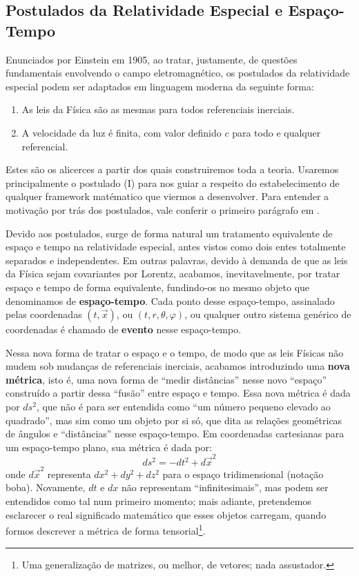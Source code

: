 \documentclass[12pt,a4paper]{article}
\begin{document}
\subsection{Postulados da Relatividade Especial e Espaço-Tempo}
Enunciados por Einstein em 1905, ao tratar, justamente,
de questões fundamentais envolvendo o campo eletromagnético\cite{einstein1905}, os postulados da relatividade
especial podem ser adaptados em linguagem moderna da seguinte forma:
\begin{enumerate}[label=\Roman*.]
  \item As leis da Física são as mesmas para todos referenciais inerciais.
  \item A velocidade da luz é finita, com valor definido $c$ para todo e qualquer referencial.
\end{enumerate}

Estes são os alicerces a partir dos quais construiremos toda a teoria. Usaremos principalmente o postulado (I)
para nos guiar a respeito do estabelecimento de qualquer framework matématico que viermos a desenvolver. Para
entender a motivação por trás dos postulados, vale conferir o primeiro parágrafo em \cite{einstein1905}.

Devido aos postulados, surge de forma natural um tratamento equivalente de espaço e tempo na relatividade
especial, antes vistos como dois entes totalmente separados e independentes. Em outras palavras, devido à demanda
de que as leis da Física sejam covariantes por Lorentz, acabamos, inevitavelmente, por tratar espaço e tempo de
forma equivalente, fundindo-os no mesmo objeto que denominamos de \textbf{espaço-tempo}. Cada ponto desse
espaço-tempo, assinalado pelas coordenadas $(t,\vec{x})$, ou $(t,r,\theta,\varphi)$, ou qualquer outro sistema genérico de
coordenadas é chamado de \textbf{evento} nesse espaço-tempo.

Nessa nova forma de tratar o espaço e o tempo, de modo que as leis Físicas não mudem sob mudanças de referenciais
inerciais, acabamos introduzindo uma \textbf{nova métrica}, isto é, uma nova forma de \enquote{medir distâncias} nesse novo
\enquote{espaço} construído a partir dessa \enquote{fusão} entre espaço e tempo. Essa nova métrica é dada
por $ds^2$, que não é para ser entendida como \enquote{um número pequeno elevado ao quadrado}, mas sim 
como um objeto por si só, que dita as relações geométricas de ângulos e \enquote{distâncias} nesse espaço-tempo.
Em coordenadas cartesianas para um espaço-tempo plano, sua métrica é dada por:
\begin{equation*}
  ds^2 = -dt^2 + d\vec{x}^2
\end{equation*}
onde $d\vec{x}^2$ representa $dx^2 + dy^2 + dz^2$ para o espaço tridimensional (notação boba). Novamente,
$dt$ e $dx$ não representam \enquote{infinitesimais}, mas podem ser entendidos como tal num primeiro momento;
mais adiante, pretendemos esclarecer o real significado matemático que esses objetos carregam, quando formos
descrever a métrica de forma tensorial\footnote{Uma generalização de matrizes, ou melhor, de vetores; nada assustador.}.
\end{document}
